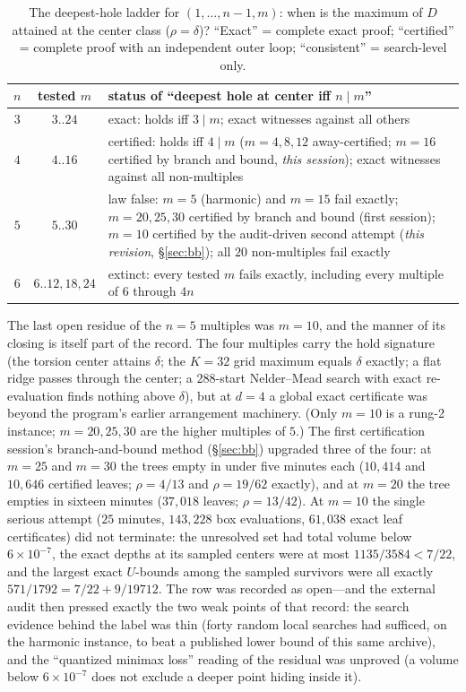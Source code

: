\begin{table}[htbp]
\centering
\small
\caption{The deepest-hole ladder for $(1,\dots,n{-}1,m)$: when is the
maximum of $D$ attained at the center class ($\rho=\delta$)?
``Exact'' = complete exact proof; ``certified'' = complete proof with an
independent outer loop; ``consistent'' = search-level only.}
\label{tab:ladder}
\begin{tabularx}{\textwidth}{@{} c c >{\raggedright\arraybackslash}X @{}}
\toprule
$n$ & tested $m$ & status of ``deepest hole at center iff $n\mid m$''
\\
\midrule
$3$ & $3..24$ & exact: holds iff $3\mid m$; exact witnesses against all
others \\
$4$ & $4..16$ & certified: holds iff $4\mid m$ ($m=4,8,12$
away-certified; $m=16$ certified by branch and bound, \emph{this
session}); exact witnesses against all non-multiples \\
$5$ & $5..30$ & law false: $m=5$ (harmonic) and $m=15$ fail exactly;
$m=20,25,30$ certified by branch and bound (first session);
$m=10$ certified by the audit-driven second attempt (\emph{this
revision}, \S\ref{sec:bb}); all $20$ non-multiples fail exactly \\
$6$ & $6..12,18,24$ & extinct: every tested $m$ fails exactly, including
every multiple of $6$ through $4n$ \\
\bottomrule
\end{tabularx}
\end{table}

The last open residue of the $n=5$ multiples was $m=10$, and the
manner of its closing is itself part of the record. The four
multiples carry the hold signature (the torsion center attains
$\delta$; the $K=32$ grid maximum equals $\delta$ exactly; a flat ridge
passes through the center; a $288$-start Nelder--Mead search with exact
re-evaluation finds nothing above $\delta$), but at $d=4$ a global exact
certificate was beyond the program's earlier arrangement machinery.
(Only $m=10$ is a rung-2 instance; $m=20,25,30$ are the higher
multiples of $5$.) The first certification session's branch-and-bound
method (\S\ref{sec:bb}) upgraded three of the four: at $m=25$ and
$m=30$ the trees empty in under five minutes each ($10{,}414$ and
$10{,}646$ certified leaves; $\rho=4/13$ and $\rho=19/62$ exactly), and
at $m=20$ the tree empties in sixteen minutes ($37{,}018$ leaves;
$\rho=13/42$). At $m=10$ the single serious attempt ($25$ minutes,
$143{,}228$ box evaluations, $61{,}038$ exact leaf certificates) did
not terminate: the unresolved set had total volume below
$6\times10^{-7}$, the exact depths at its sampled centers were at most
$1135/3584<7/22$, and the largest exact $U$-bounds among the sampled
survivors were all exactly $571/1792=7/22+9/19712$. The row was
recorded as open---and the external audit then pressed exactly the two
weak points of that record: the search evidence behind the label was
thin (forty random local searches had sufficed, on the harmonic
instance, to beat a published lower bound of this same archive), and
the ``quantized minimax loss'' reading of the residual was unproved
(a volume below $6\times10^{-7}$ does not exclude a deeper point
hiding inside it).

